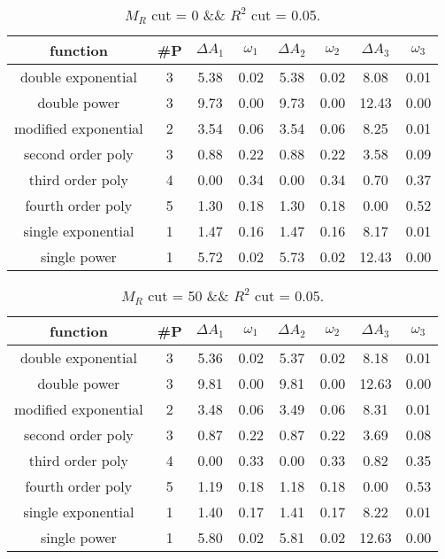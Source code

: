  
\begin{table}[H] 
\begin{center} 
\begin{tabular}{|c|c|cc|cc|cc|} 
\hline function & \#P & $\Delta A_1$ & $\omega_1$ & $\Delta A_2$ & $\omega_2$ & $\Delta A_3$ & $\omega_3$ \\ \hline 
double exponential &  3 &   5.38 &   0.02 &   5.38 &   0.02 &   8.08 &   0.01 \\ 
double power &  3 &   9.73 &   0.00 &   9.73 &   0.00 &  12.43 &   0.00 \\ 
modified exponential &  2 &   3.54 &   0.06 &   3.54 &   0.06 &   8.25 &   0.01 \\ 
second order poly &  3 &   0.88 &   0.22 &   0.88 &   0.22 &   3.58 &   0.09 \\ 
third order poly &  4 &   0.00 &   0.34 &   0.00 &   0.34 &   0.70 &   0.37 \\ 
fourth order poly &  5 &   1.30 &   0.18 &   1.30 &   0.18 &   0.00 &   0.52 \\ 
single exponential &  1 &   1.47 &   0.16 &   1.47 &   0.16 &   8.17 &   0.01 \\ 
single power &  1 &   5.72 &   0.02 &   5.73 &   0.02 &  12.43 &   0.00 \\ 
\hline 
\end{tabular} 
\caption{$M_R$ cut = 0 \&\& $R^2$ cut = 0.05.} 
\label{tab:FitChoices_0_0.05} 
\end{center} 
\end{table} 
 
 
\begin{table}[H] 
\begin{center} 
\begin{tabular}{|c|c|cc|cc|cc|} 
\hline function & \#P & $\Delta A_1$ & $\omega_1$ & $\Delta A_2$ & $\omega_2$ & $\Delta A_3$ & $\omega_3$ \\ \hline 
double exponential &  3 &   5.36 &   0.02 &   5.37 &   0.02 &   8.18 &   0.01 \\ 
double power &  3 &   9.81 &   0.00 &   9.81 &   0.00 &  12.63 &   0.00 \\ 
modified exponential &  2 &   3.48 &   0.06 &   3.49 &   0.06 &   8.31 &   0.01 \\ 
second order poly &  3 &   0.87 &   0.22 &   0.87 &   0.22 &   3.69 &   0.08 \\ 
third order poly &  4 &   0.00 &   0.33 &   0.00 &   0.33 &   0.82 &   0.35 \\ 
fourth order poly &  5 &   1.19 &   0.18 &   1.18 &   0.18 &   0.00 &   0.53 \\ 
single exponential &  1 &   1.40 &   0.17 &   1.41 &   0.17 &   8.22 &   0.01 \\ 
single power &  1 &   5.80 &   0.02 &   5.81 &   0.02 &  12.63 &   0.00 \\ 
\hline 
\end{tabular} 
\caption{$M_R$ cut = 50 \&\& $R^2$ cut = 0.05.} 
\label{tab:FitChoices_50_0.05} 
\end{center} 
\end{table} 
 
